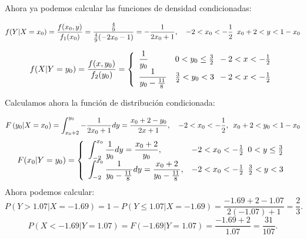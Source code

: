 \documentclass[a4paper, 11pt]{article}
\begin{document}
Ahora ya podemos calcular las funciones de densidad condicionadas:

\[
f(Y|X=x_0)=\displaystyle\frac{f(x_0,y)}{f_1(x_0)}=\frac{\frac{4}{9}}{\frac{4}{9}(-2x_0-1)}=-\frac{1}{2x_0+1}, \quad -2<x_0<-\frac{1}{2} \enskip x_0+2 < y < 1-x_0
\]

\[
f(X|Y=y_0)=\displaystyle\frac{f(x,y_0)}{f_2(y_0)} =\left \{ \begin{array}{ll}
\displaystyle\frac{1}{y_0} & 0 < y_0 \leq \frac{3}{2} \enskip -2 < x < -\frac{1}{2}\\
\displaystyle\frac{1}{y_0-\frac{11}{8}} & \frac{3}{2} < y_0 < 3 \enskip -2 < x < -\frac{1}{2}
\end{array}\right.
\]

Calculamos ahora la función de distribución condicionada:

\[
F\left(y_0|X=x_0\right)=\displaystyle\int_{x_0+2}^{y_0}-\displaystyle\frac{1}{2x_0+1}dy=\frac{x_0+2-y_0}{2x+1}, \quad -2<x_0<-\frac{1}{2}, \enskip x_0+2<y_0<1-x_0
\]
\[
F(x_0|Y=y_0) =\left \{ \begin{array}{ll}
\displaystyle\int_{-2}^{x_0}\frac{1}{y_0}dy=\frac{x_0+2}{y_0}, & -2 < x_0 < -\frac{1}{2} \enskip 0 < y \leq \frac{3}{2}\\
\displaystyle\int_{-2}^{x_0}\frac{1}{y_0-\frac{11}{8}}dy=\frac{x_0+2}{y_0-\frac{11}{8}}, & -2 < x_0 < -\frac{1}{2} \enskip \frac{3}{2} < y < 3
\end{array}\right.
\]
Ahora podemos calcular:
\[
P(Y>1.07|X=-1.69)=1-P(Y\leq 1.07|X=-1.69)=\frac{-1.69+2-1.07}{2(-1.07)+1}=\frac{2}{3}.
\]
\[
P(X<-1.69|Y=1.07)=F(-1.69|Y=1.07)=\frac{-1.69+2}{1.07}=\frac{31}{107}.
\]
\end{document}
